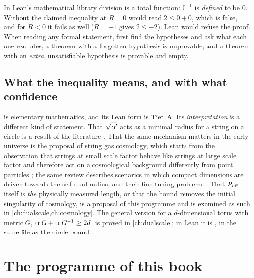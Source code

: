 \begin{pitfallbox}
In Lean's mathematical library division is a total function: $0^{-1}$ is \emph{defined} to be
$0$. Without  the claimed inequality at $R=0$ would read $2\le0+0$, which is false, and
for $R<0$ it fails as well ($R=-1$ gives $2\le-2$). Lean would refuse the proof. When reading
any formal statement, first find the hypotheses and ask what each one excludes; a theorem
with a forgotten hypothesis is unprovable, and a theorem with an \emph{extra}, unsatisfiable
hypothesis is provable and empty.
\end{pitfallbox}

\subsection{What the inequality means, and with what confidence}

 is elementary mathematics, and its Lean form is Tier~A. Its
\emph{interpretation} is a different kind of statement. That $\sqrt{\alpha'}$ acts as a minimal
radius for a string on a circle is a result of the literature \TL{}
. That the same mechanism matters in the early universe
is the proposal of string gas cosmology, which starts from the observation that strings at
small scale factor behave like strings at large scale factor and therefore act on a
cosmological background differently from point particles
; the same review describes scenarios in which compact
dimensions are driven towards the self-dual radius, and their fine-tuning problems \TL{}
. That $R_{\rm eff}$ itself is \emph{the}
physically measured length, or that the bound removes the initial singularity of cosmology,
is a proposal of this programme \TC{} and is examined as such in
\cref{ch:dualscale,ch:cosmology}. The general version for a $d$-dimensional torus with metric
$G$, $\operatorname{tr} G+\operatorname{tr} G^{-1}\ge2d$, is proved in \cref{ch:dualscale}; in Lean it is
, in the same file as the circle bound \TA.

\section{The programme of this book}\label{sec:intro:programme}

